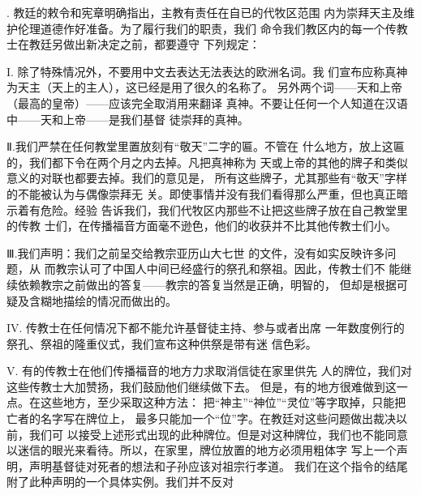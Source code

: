 {. 教廷的敕令和宪章明确指出，主教有责任在自已的代牧区范围}%
{\bookkai 内为崇拜天主及维护伦理道德作好准备。为了履行我们的职责，我们}%
{\bookkai 命令我们教区内的每一个传教士在教廷另做出新决定之前，都要遵守}%
{\bookkai 下列规定：}%
\par
{\bookkai I. 除了特殊情况外，不要用中文去表达无法表达的欧洲名词。我}%
{\bookkai 们宣布应称真神为天主（天上的主人），这已经是用了很久的名称了。}%
{\bookkai 另外两个词——天和上帝（最高的皇帝）——应该完全取消用来翻译}%
{\bookkai 真神。不要让任何一个人知道在汉语中——天和上帝——是我们基督}%
{\bookkai 徒崇拜的真神。}%
\par
{\bookkai Ⅱ.我们严禁在任何教堂里置放刻有“敬天”二字的匾。不管在}%
{\bookkai 什么地方，放上这匾的，我们都下令在两个月之内去掉。凡把真神称为}%
{\bookkai 天或上帝的其他的牌子和类似意义的对联也都要去掉。我们的意见是，}%
{\bookkai 所有这些牌子，尤其那些有“敬天”字样的不能被认为与偶像崇拜无}%
{\bookkai 关。即使事情并没有我们看得那么严重，但也真正暗示着有危险。经验}%
{\bookkai 告诉我们，我们代牧区内那些不让把这些牌子放在自己教堂里的传教}%
{\bookkai 士们，在传播福音方面毫不逊色，他们的收获并不比其他传教士们小。}%
\par
{\bookkai Ⅲ.我们声明：我们之前呈交给教宗亚历山大七世}%
{\bookkai {}的文件，没有如实反映许多问题，从}%
{\bookkai 而教宗认可了中国人中间已经盛行的祭孔和祭祖。因此，传教士们不}%
{\bookkai 能继续依赖教宗之前做出的答复——教宗的答复当然是正确，明智的，}%
{\bookkai 但却是根据可疑及含糊地描绘的情况而做出的。}%
\par
{\bookkai IV. 传教士在任何情况下都不能允许基督徒主持、参与或者出席}%
{\bookkai 一年数度例行的祭孔、祭祖的隆重仪式，我们宣布这种供祭是带有迷}%
{\bookkai 信色彩。}%
\par
{\bookkai V. 有的传教士在他们传播福音的地方力求取消信徒在家里供先}%
{\bookkai 人的牌位，我们对这些传教士大加赞扬，我们鼓励他们继续做下去。}%
{\bookkai 但是，有的地方很难做到这一点。在这些地方，至少采取这种方法：}%
{\bookkai 把“神主”“神位”“灵位”等字取掉，只能把亡者的名字写在牌位上，}%
{\bookkai 最多只能加一个“位”字。在教廷对这些问题做出裁决以前，我们可}%
{\bookkai 以接受上述形式出现的此种牌位。但是对这种牌位，我们也不能同意}%
{\bookkai 以迷信的眼光来看待。所以，在家里，牌位放置的地方必须用粗体字}%
{\bookkai 写上一个声明，声明基督徒对死者的想法和子孙应该对祖宗行孝道。}%
{\bookkai 我们在这个指令的结尾附了此种声明的一个具体实例。我们并不反对}%
